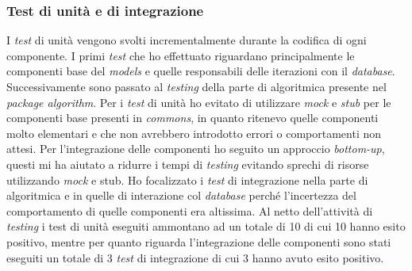 \subsubsection{Test di unità e di integrazione}
I \emph{test} di unità vengono svolti incrementalmente durante la codifica di ogni componente. I primi \emph{test} che ho effettuato riguardano principalmente le componenti base del \emph{models} e quelle responsabili delle iterazioni con il \emph{database}. Successivamente sono passato al \emph{testing} della parte di algoritmica presente nel \emph{package algorithm}. Per i \emph{test} di unità ho evitato di utilizzare \emph{mock} e \emph{stub} per le componenti base presenti in \emph{commons}, in quanto ritenevo quelle componenti molto elementari e che non avrebbero introdotto errori o comportamenti non attesi. Per l'integrazione delle componenti ho seguito un approccio \emph{bottom-up}, questi mi ha aiutato a ridurre i tempi di \emph{testing} evitando sprechi di risorse utilizzando \emph{mock} e {stub}. Ho focalizzato i \emph{test} di integrazione nella parte di algoritmica e in quelle di interazione col \emph{database} perché l'incertezza del comportamento di quelle componenti era altissima. Al netto dell'attività di \emph{testing} i test di unità eseguiti ammontano ad un totale di 10 di cui 10 hanno esito positivo, mentre per quanto riguarda l'integrazione delle componenti sono stati eseguiti un totale di 3 \emph{test} di integrazione di cui 3 hanno avuto esito positivo.

